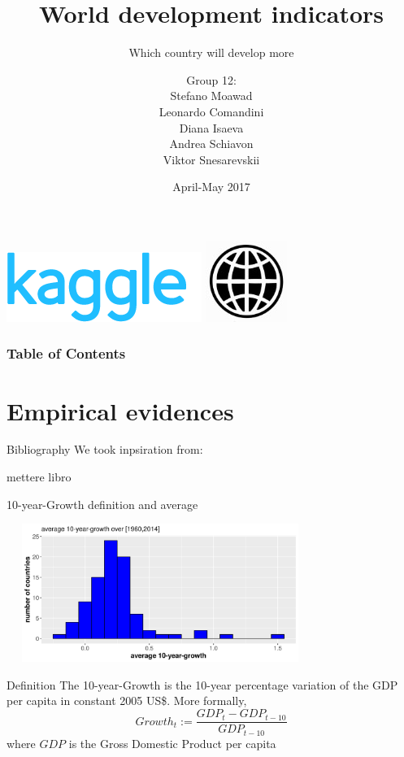 \documentclass[9pt]{beamer}
\title[World development indicators]{\huge World development indicators}
\subtitle[Which country will develop more]{\large Which country will develop more}
\author[Moawad, Comandini, Isaeva, Schiavon, Snesarevskii] {{\Large Group 12:\\}Stefano Moawad\\Leonardo Comandini\\Diana Isaeva\\Andrea Schiavon\\Viktor Snesarevskii}
\date{April-May 2017}
\begin{document}
	\begin{frame}
	\titlepage
	\vfill
	\begin{flushright}
		\includegraphics[height=.7cm]{kaggle.png}\quad
		\includegraphics[height=.7cm]{worldbank.jpg}
	\end{flushright}
\end{frame}

\begin{frame}
	\frametitle{Table of Contents}
	\tableofcontents
\end{frame}


\section{Empirical evidences}

\begin{frame}{Bibliography}
   We took inpsiration from:
   
   mettere libro
   
\end{frame}

\begin{frame}{10-year-Growth definition and average}
	\begin{block}{}
		\includegraphics[height=4.5cm,width=10cm]{growth_hist.png}
	\end{block}
	\begin{block}{Definition}
		 The \alert{10-year-Growth} is the 10-year percentage variation of the GDP per capita in constant 2005 US\$. More formally,
		\begin{equation}
		Growth_{t} := \frac{GDP_{t}-GDP_{t-10}}{GDP_{t-10}}
		\end{equation}
		where $ GDP $ is the Gross Domestic Product per capita
		
	\end{block}
\end{frame}
\end{document}

